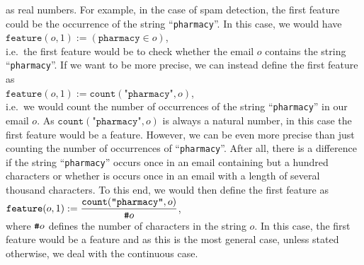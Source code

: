 as real numbers.  For example, in the case of spam detection, the first feature
could be the occurrence of the string ``\texttt{pharmacy}''.  In this case, we would have
\\[0.2cm]
\hspace*{1.3cm}
$\texttt{feature}(o, 1) := (\texttt{pharmacy} \in o)$,
\\[0.2cm]
i.e.~the first feature would be to check whether the email $o$ contains the string ``\texttt{pharmacy}''.  
If we want to be more precise, we can instead define the first feature as
\\[0.2cm]
\hspace*{1.3cm}
$\texttt{feature}(o, 1) := \mathtt{count}(\texttt{"pharmacy"}, o)$,
\\[0.2cm]
i.e.~we would count the number of occurrences of the string ``\texttt{pharmacy}'' in our email $o$.   
As $\mathtt{count}(\texttt{"pharmacy"}, o)$ is always a natural number, in this case the first feature would be a
  feature.  However, we can be even more precise than just counting the number of occurrences of
 ``\texttt{pharmacy}''.  After all, there is a difference if the string ``\texttt{pharmacy}'' occurs once in an email
 containing but a hundred characters or whether is occurs once in an email with a length of several thousand
 characters.  To this end, we would then define the first feature as
\\[0.2cm]
\hspace*{1.3cm}
$\displaystyle \texttt{feature}(o, 1) := \frac{\mathtt{count}(\texttt{"pharmacy"}, o)}{\texttt{\#} o}$, 
\\[0.2cm]
where $\texttt{\#} o$ defines the number of characters in the string $o$.  In this case, the first feature would be a
 feature and as this is the most general case, unless stated otherwise, we deal with the continuous
case. 

